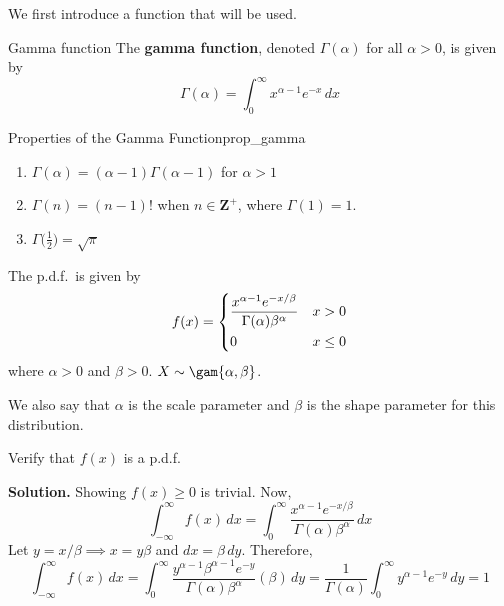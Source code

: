 We first introduce a function that will be used.

\begin{Definition}{Gamma function}{}
    The \textbf{gamma function},
    denoted $ \Gamma(\alpha) $ for all $ \alpha>0 $, is given by
    \[ \Gamma(\alpha)=\int_{0}^{\infty} x^{\alpha-1}e^{-x}\, d{x}  \]
\end{Definition}
\begin{Proposition}{Properties of the Gamma Function}{prop_gamma}
    \begin{enumerate}[label=(\arabic*)]
        \item\label{gamma_prop_1}$ \Gamma(\alpha)=(\alpha-1)\Gamma(\alpha-1) $ for $ \alpha>1 $
        \item\label{gamma_prop_2} $ \Gamma(n)=(n-1)! $ when $ n\in\mathbf{Z}^+ $,
              where $ \Gamma(1)=1 $.
        \item\label{gamma_prop_3} $ \displaystyle \Gamma\biggl(\frac{1}{2}\biggr)=\sqrt{\pi} $
    \end{enumerate}
\end{Proposition}
\begin{Example}{}{}
    The p.d.f.\ is given by
    \[ f(x)=\begin{dcases}
            \frac{x^{\alpha-1}e^{-x/\beta}}{\Gamma(\alpha)\beta^\alpha} & x>0    \\
            0                                                           & x\le 0
        \end{dcases}
    \]
    where $ \alpha>0 $ and $ \beta>0 $. $ X \sim \gam{\alpha,\beta} $.

    We also say that $ \alpha $ is the scale parameter and $ \beta $ is the shape parameter
    for this distribution.

    Verify that $ f(x) $ is a p.d.f.

    \textbf{Solution.} Showing $ f(x)\ge 0 $ is trivial. Now,
    \[ \int_{-\infty}^{\infty} f(x)\, d{x} =
        \int_{0}^{\infty} \frac{x^{\alpha-1}e^{-x/\beta}}{\Gamma(\alpha)
        \beta^{\alpha}} \, d{x}  \]
    Let $ y=x/\beta\implies x=y\beta $ and $ dx=\beta\,dy $.
    Therefore,
    \[\int_{-\infty}^{\infty} f(x)\, d{x} =\int_{0}^{\infty}
        \frac{y^{\alpha-1}\beta^{\alpha-1}e^{-y}}{\Gamma(\alpha)\beta^\alpha}(\beta)  \, d{y}
        =\frac{1}{\Gamma(\alpha)}\int_{0}^{\infty} y^{\alpha-1}e^{-y}\, d{y}=1    \]
\end{Example}

